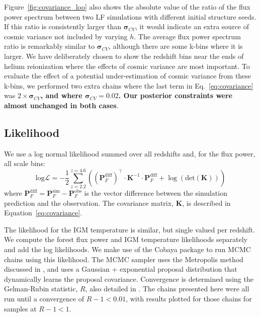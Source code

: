 Figure~\ref{fig:covariance_loo} also shows the absolute value of the ratio of the flux power spectrum between two LF simulations with different initial structure seeds. If this ratio is consistently larger than $\boldsymbol{\sigma}_{CV}$, it would indicate an extra source of cosmic variance not included by varying $h$. The average flux power spectrum ratio is remarkably similar to $\boldsymbol{\sigma}_{CV}$, although there are some  k-bins where it is larger. We have deliberately chosen to show the redshift bins near the ends of helium reionization where the effects of cosmic variance are most important. To evaluate the effect of a potential under-estimation of cosmic variance from these k-bins, we performed two extra chains where the last term in Eq.~\ref{eq:covariance} was $2\times \boldsymbol{\sigma}_{CV}$\textbf{, and where $\boldsymbol{\sigma}_{CV} = 0.02$. Our posterior constraints were almost unchanged in both cases}.

\subsection{Likelihood}\label{sec:likelihood}

We use a log normal likelihood summed over all redshifts and, for the flux power, all scale bins:
\begin{equation}
    \mathrm{log}\mathcal{L} = -\frac{1}{2} \sum_{z=2.2}^{z=4.6} \left(\left(\boldsymbol{P}_F^{\mathrm{diff}}\right)^\top \cdot \boldsymbol{K}^{-1} \cdot \boldsymbol{P}_F^{\mathrm{diff}} + \log\left( \mathrm{det}(\boldsymbol{K})\right)\right)
    \label{eq:likelihood}
\end{equation}
where $\boldsymbol{P}_F^{\mathrm{diff}} = \boldsymbol{P}_F^{\mathrm{sim}} - \boldsymbol{P}_F^{\mathrm{obs}}$ is the vector difference between the simulation prediction and the observation.
The covariance matrix, $\boldsymbol{K}$, is described in Equation~\ref{eq:covariance}. 

The likelihood for the IGM temperature is similar, but single valued per redshift.
We compute the \lya forest flux power and IGM temperature likelihoods separately and add the log likelihoods. We make use of the Cobaya package \cite{2021JCAP...05..057T, 2019ascl.soft10019T, 2013PhRvD..87j3529L, 2002PhRvD..66j3511L} to run MCMC chains using this likelihood.
The MCMC sampler uses the Metropolis method discussed in \cite{2013PhRvD..87j3529L}, and uses a Gaussian + exponential proposal distribution that dynamically learns the proposal covariance.
Convergence is determined using the Gelman-Rubin statistic, $R$, also detailed in \cite{2013PhRvD..87j3529L}.
The chains presented here were all run until a convergence of $R-1 < 0.01$, with results plotted for those chains for samples at $R-1 < 1$.

